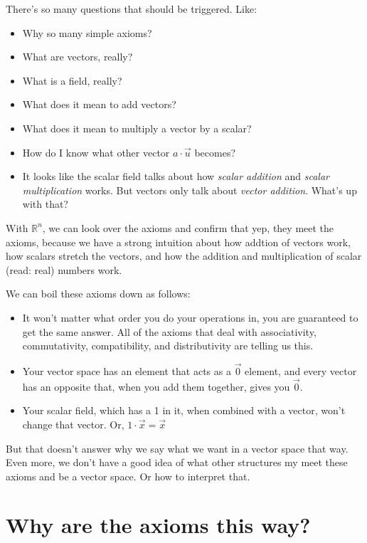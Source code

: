 \documentclass[
]{book}
\providecommand{\tightlist}{%
  \setlength{\itemsep}{0pt}\setlength{\parskip}{0pt}}
\begin{document}
There's so many questions that should be triggered. Like:

\begin{itemize}
\tightlist
\item
  Why so many simple axioms?
\item
  What are vectors, really?
\item
  What is a field, really?
\item
  What does it mean to add vectors?
\item
  What does it mean to multiply a vector by a scalar?
\item
  How do I know what other vector \(a \cdot \vec{u}\) becomes?
\item
  It looks like the scalar field talks about how \emph{scalar addition} and \emph{scalar multiplication} works. But vectors only talk about \emph{vector addition}. What's up with that?
\end{itemize}

With \(\mathbb{R}^n\), we can look over the axioms and confirm that yep, they meet the axioms, because we have a strong intuition about how addtion of vectors work, how scalars stretch the vectors, and how the addition and multiplication of scalar (read: real) numbers work.

We can boil these axioms down as follows:

\begin{itemize}
\tightlist
\item
  It won't matter what order you do your operations in, you are guaranteed to get the same answer. All of the axioms that deal with associativity, commutativity, compatibility, and distributivity are telling us this.
\item
  Your vector space has an element that acts as a \(\vec{0}\) element, and every vector has an opposite that, when you add them together, gives you \(\vec{0}\).
\item
  Your scalar field, which has a 1 in it, when combined with a vector, won't change that vector. Or, \(1 \cdot \vec{x} = \vec{x}\)
\end{itemize}

But that doesn't answer why we say what we want in a vector space that way. Even more, we don't have a good idea of what other structures my meet these axioms and be a vector space. Or how to interpret that.

\hypertarget{why-are-the-axioms-this-way}{%
\section{Why are the axioms this way?}\label{why-are-the-axioms-this-way}}
\end{document}
